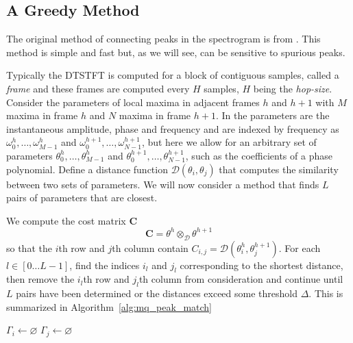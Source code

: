 \subsection{A Greedy Method}

The original method of connecting peaks in the spectrogram is from
\cite{mcaulay1986speech}. This method is simple and fast but, as we will see,
can be sensitive to spurious peaks.

Typically the DTSTFT is computed for a block of contiguous samples, called a
\textit{frame} and these frames are computed every $H$ samples, $H$ being the
\textit{hop-size}. Consider the parameters of local maxima in adjacent frames
$h$ and $h+1$ with $M$ maxima in frame $h$ and $N$ maxima in frame $h+1$. In
\cite{mcaulay1986speech}  the parameters are the instantaneous amplitude, phase
and frequency and are indexed by frequency as $\omega_0^{h}, \dotsc,
\omega_{M-1}^{h}$ and $\omega_0^{h+1}, \dotsc, \omega_{N-1}^{h+1}$, but here we
allow for an arbitrary set of parameters $\theta_0^{h}, \dotsc,
\theta_{M-1}^{h}$ and $\theta_0^{h+1}, \dotsc,
\theta_{N-1}^{h+1}$, such as the coefficients of a phase polynomial. Define a
distance function $\mathcal{D} \left( \theta_{i},\theta_{j} \right)$ that computes the
similarity between two sets of parameters. We will now consider a method that
finds $L$ pairs of parameters that are closest.

We compute the cost matrix $\boldsymbol{C}$
\[
    \boldsymbol{C} = \theta^{h} \otimes_{\mathcal{D}} \theta^{h+1}
\]
so that the $i$th row and $j$th column contain $C_{i,j} = \mathcal{D} \left(
\theta_{i}^{h},\theta_{j}^{h+1} \right)$.  For each $l \in \left[0 \dotsc L-1
\right]$, find the indices $i_{l}$ and $j_{l}$ corresponding to the shortest
distance, then remove the $i_{l}$th row and $j_{l}$th column from consideration
and continue until $L$ pairs have been determined or the distances exceed some
threshold $\Delta$. This is summarized in Algorithm~\ref{alg:mq_peak_match}

\begin{algorithm}[H]
    \caption{\label{alg:mq_peak_match}}
    $\Gamma_{i} \leftarrow \varnothing$\;
    $\Gamma_{j} \leftarrow \varnothing$\;
\end{algorithm}

